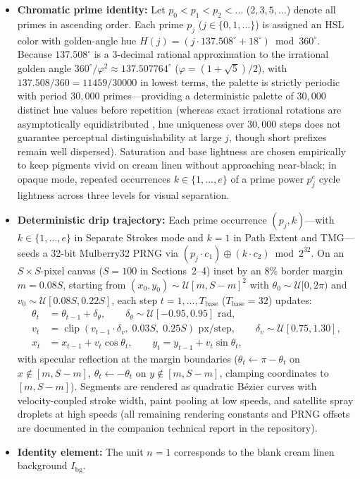 \documentclass[]{interact}
\theoremstyle{plain}
\theoremstyle{definition}
\theoremstyle{remark}
\begin{document}
\begin{itemize}
  \item \textbf{Chromatic prime identity:} Let $p_0 < p_1 < p_2 < \dots$ ($2, 3, 5, \dots$) denote all primes in ascending order. Each prime $p_j$ ($j \in \{0, 1, \dots\}$) is assigned an HSL color with golden-angle hue $H(j) = (j \cdot 137.508^\circ + 18^\circ) \bmod 360^\circ$. Because $137.508^\circ$ is a $3$-decimal rational approximation to the irrational golden angle $360^\circ / \varphi^2 \approx 137.507764^\circ$ ($\varphi = (1+\sqrt{5})/2$), with $137.508 / 360 = 11459 / 30000$ in lowest terms, the palette is strictly periodic with period $30{,}000$ primes—providing a deterministic palette of $30{,}000$ distinct hue values before repetition (whereas exact irrational rotations are asymptotically equidistributed \citep{kuipers1974uniform}, hue uniqueness over $30{,}000$ steps does not guarantee perceptual distinguishability at large $j$, though short prefixes remain well dispersed). Saturation and base lightness are chosen empirically to keep pigments vivid on cream linen without approaching near-black; in opaque mode, repeated occurrences $k \in \{1, \dots, e\}$ of a prime power $p_j^e$ cycle lightness across three levels for visual separation.
  \item \textbf{Deterministic drip trajectory:} Each prime occurrence $(p_j, k)$—with $k \in \{1, \dots, e\}$ in Separate Strokes mode and $k = 1$ in Path Extent and TMG—seeds a 32-bit Mulberry32 PRNG via $(p_j \cdot c_1) \oplus (k \cdot c_2) \bmod 2^{32}$. On an $S \times S$-pixel canvas ($S = 100$ in Sections~2--4) inset by an $8\%$ border margin $m = 0.08S$, starting from $(x_0, y_0) \sim \mathcal{U}[m, S-m]^2$ with $\theta_0 \sim \mathcal{U}[0, 2\pi)$ and $v_0 \sim \mathcal{U}[0.08S, 0.22S]$, each step $t = 1, \dots, T_{\mathrm{base}}$ ($T_{\mathrm{base}} = 32$) updates:
  \begin{align}
    \theta_t &= \theta_{t-1} + \delta_\theta, \qquad \delta_\theta \sim \mathcal{U}[-0.95, 0.95]\text{~rad}, \label{eq:drip_angle} \\
    v_t &= \operatorname{clip}\!\left(v_{t-1} \cdot \delta_v,\; 0.03S,\; 0.25S\right)\text{~px/step}, \qquad \delta_v \sim \mathcal{U}[0.75, 1.30], \label{eq:drip_speed} \\
    x_t &= x_{t-1} + v_t \cos\theta_t, \qquad y_t = y_{t-1} + v_t \sin\theta_t, \label{eq:drip_pos}
  \end{align}
  with specular reflection at the margin boundaries ($\theta_t \leftarrow \pi - \theta_t$ on $x \notin [m, S-m]$, $\theta_t \leftarrow -\theta_t$ on $y \notin [m, S-m]$, clamping coordinates to $[m, S-m]$). Segments are rendered as quadratic B\'ezier curves with velocity-coupled stroke width, paint pooling at low speeds, and satellite spray droplets at high speeds (all remaining rendering constants and PRNG offsets are documented in the companion technical report in the repository).
  \item \textbf{Identity element:} The unit $n = 1$ corresponds to the blank cream linen background $I_{\mathrm{bg}}$.
\end{itemize}
\end{document}
